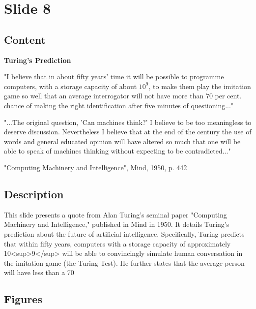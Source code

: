 \documentclass{article}%
\begin{document}
%
\newpage%
\section{Slide 8}%
\label{sec:Slide8}%
\subsection{Content}%

\textbf{Turing's Prediction}

"I believe that in about fifty years' time it will be possible to programme computers,
with a storage capacity of about $10^9$, to make them play the imitation game so well
that an average interrogator will not have more than 70 per cent. chance of making
the right identification after five minutes of questioning..."

"...The original question, 'Can machines think?' I believe to be too meaningless to
deserve discussion. Nevertheless I believe that at the end of the century the use of
words and general educated opinion will have altered so much that one will be able to
speak of machines thinking without expecting to be contradicted..."

"Computing Machinery and Intelligence", Mind, 1950, p. 442
%
\subsection{Description}%
This slide presents a quote from Alan Turing's seminal paper "Computing Machinery and Intelligence," published in Mind in 1950.  It details Turing's prediction about the future of artificial intelligence.  Specifically, Turing predicts that within fifty years, computers with a storage capacity of approximately 10<sup>9</sup> will be able to convincingly simulate human conversation in the imitation game (the Turing Test).  He further states that the average person will have less than a 70%
\subsection{Figures}%
\begin{figure}[H]%
\centering%
\end{figure}
\end{document}
